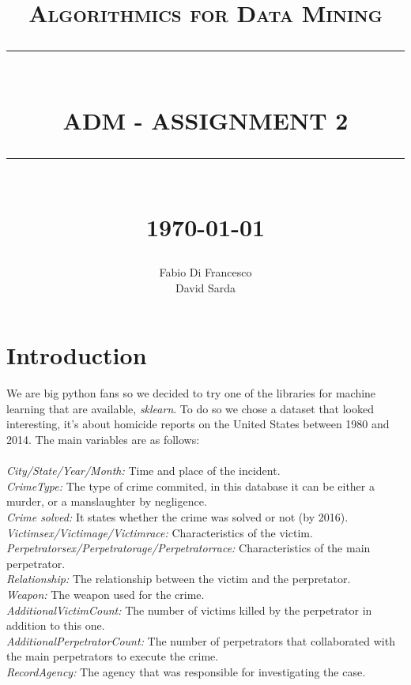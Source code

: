 \documentclass[12pt]{report}
\newcommand{\HRule}[1]{\rule{\linewidth}{#1}}
\begin{document}
\title{ \normalsize \textsc{Algorithmics for Data Mining}
		\\ [2.0cm]
		\HRule{0.5pt} \\
		\LARGE \textbf{\uppercase{ADM - Assignment 2}}
		\HRule{2pt} \\ [0.5cm]
		\normalsize \today \vspace*{5\baselineskip}}

\date{}

\author{
		Fabio Di Francesco \\ 
		David Sarda }

\maketitle
\tableofcontents
\newpage

\sectionfont{\scshape}


\section{Introduction}

We are big python fans so we decided to try one of the libraries for machine learning that are available, \textit{sklearn}. To do so we chose a dataset that looked interesting, it's about homicide reports on the United States between 1980 and 2014. The main variables are as follows:
\\\\
\emph{City/State/Year/Month:} Time and place of the incident.\\
\emph{CrimeType:} The type of crime commited, in this database it can be either a murder, or a manslaughter by negligence.\\
\emph{Crime solved:} It states whether the crime was solved or not (by 2016).\\
\emph{Victim\textunderscore sex/Victim\textunderscore age/Victim\textunderscore race:} Characteristics of the victim.\\
\emph{Perpetrator\textunderscore sex/Perpetrator\textunderscore age/Perpetrator\textunderscore race:} Characteristics of the main perpetrator.\\
\emph{Relationship:} The relationship between the victim and the perpretator.\\
\emph{Weapon:} The weapon used for the crime.\\
\emph{Additional\textunderscore Victim\textunderscore Count:} The number of victims killed by the perpetrator in addition to this one.\\
\emph{Additional\textunderscore Perpetrator\textunderscore Count:} The number of perpetrators that collaborated with the main perpetrators to execute the crime.\\
\emph{Record\textunderscore Agency:} The agency that was responsible for investigating the case.
\end{document}
